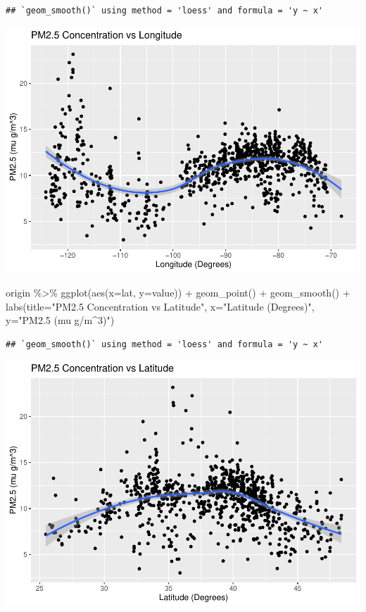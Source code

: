 \documentclass[
]{article}
\newenvironment{Shaded}{\begin{snugshade}}{\end{snugshade}}
\newcommand{\AttributeTok}[1]{\textcolor[rgb]{0.77,0.63,0.00}{#1}}
\newcommand{\FunctionTok}[1]{\textcolor[rgb]{0.00,0.00,0.00}{#1}}
\newcommand{\NormalTok}[1]{#1}
\newcommand{\SpecialCharTok}[1]{\textcolor[rgb]{0.00,0.00,0.00}{#1}}
\newcommand{\StringTok}[1]{\textcolor[rgb]{0.31,0.60,0.02}{#1}}
\begin{document}
\begin{verbatim}
## `geom_smooth()` using method = 'loess' and formula = 'y ~ x'
\end{verbatim}

\includegraphics{Draft_files/figure-latex/ExploratoryAnalysis-1.pdf}

\begin{Shaded}
\begin{Highlighting}[]
\NormalTok{origin }\SpecialCharTok{\%\textgreater{}\%} \FunctionTok{ggplot}\NormalTok{(}\FunctionTok{aes}\NormalTok{(}\AttributeTok{x=}\NormalTok{lat, }\AttributeTok{y=}\NormalTok{value)) }\SpecialCharTok{+} 
  \FunctionTok{geom\_point}\NormalTok{() }\SpecialCharTok{+} \FunctionTok{geom\_smooth}\NormalTok{() }\SpecialCharTok{+} 
  \FunctionTok{labs}\NormalTok{(}\AttributeTok{title=}\StringTok{"PM2.5 Concentration vs Latitude"}\NormalTok{, }\AttributeTok{x=}\StringTok{"Latitude (Degrees)"}\NormalTok{, }\AttributeTok{y=}\StringTok{"PM2.5 (mu g/m\^{}3)"}\NormalTok{)}
\end{Highlighting}
\end{Shaded}

\begin{verbatim}
## `geom_smooth()` using method = 'loess' and formula = 'y ~ x'
\end{verbatim}

\includegraphics{Draft_files/figure-latex/ExploratoryAnalysis-2.pdf}
\end{document}
